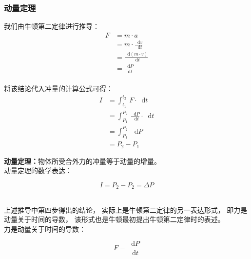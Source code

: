 \documentclass[UTF8]{ctexart}
\newcommand*{\dif}{\mathop{}\!\mathrm{d}}
\begin{document}
\subsubsection{动量定理}
    我们由牛顿第二定律进行推导：
    \setcounter{equation}{0}
    \begin{align}
        F
        &=m\cdot a\\[4mm]
        &=m\cdot\frac{\dif v}{\dif t}\\[4mm]
        &=\frac{\dif(m\cdot v)}{\dif t}\\[4mm]
        &=\frac{\dif P}{\dif t}
    \end{align}\\
    将该结论代入冲量的计算公式可得：
    \begin{align}
        I
        &=\int_{t_1}^{t_2}~F\cdot\dif t\\[4mm]
        &=\int_{P_1}^{P_2}~\frac{\dif P}{\dif t}\cdot\dif t\\[4mm]
        &=\int_{P_1}^{P_2}~\dif P\\[4mm]
        &=P_2-P_1
    \end{align}

\newpage

    \textbf{动量定理：}物体所受合外力的冲量等于动量的增量。\\[3mm]
    动量定理的数学表达：
    \begin{large}
        \begin{equation*}
            I=P_2-P_2=\Delta P
        \end{equation*}
    \end{large}\\
    上述推导中第四步得出的结论，
    实际上是牛顿第二定律的另一表达形式，
    即力是动量关于时间的导数，
    该形式也是牛顿最初提出牛顿第二定律时的表述。\\[3mm]
    力是动量关于时间的导数：
    \begin{large}
        \begin{equation*}
            F=\frac{\dif P}{\dif t}
        \end{equation*}
    \end{large}
    \vspace{-10pt}
\end{document}
